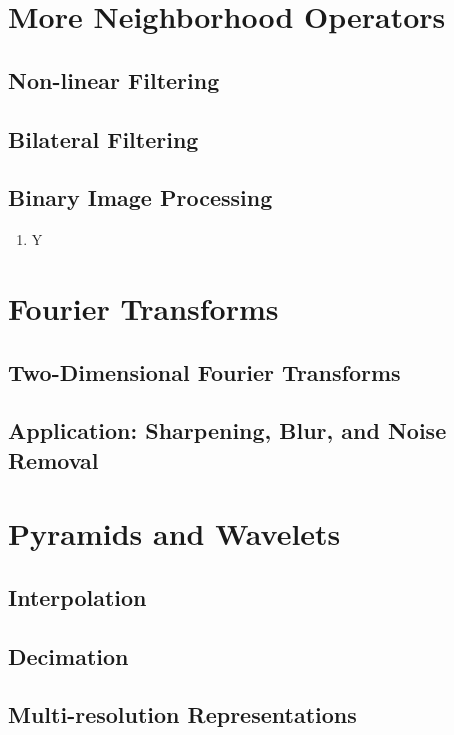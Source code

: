\documentclass[12pt]{article}
\begin{document}
\section{More Neighborhood Operators}

\subsection{Non-linear Filtering}

\subsection{Bilateral Filtering}

\subsection{Binary Image Processing}

\begin{enumerate}
    \item Y
\end{enumerate}


\section{Fourier Transforms}

\subsection{Two-Dimensional Fourier Transforms}

\subsection{Application: Sharpening, Blur, and Noise Removal}

\section{Pyramids and Wavelets}

\subsection{Interpolation}

\subsection{Decimation}

\subsection{Multi-resolution Representations}
\end{document}
